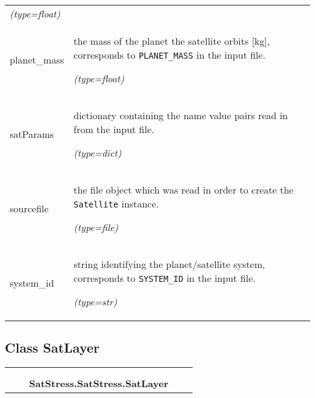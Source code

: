 \begin{longtable}{|p{\varnamewidth}|p{\vardescrwidth}|l}
            {\it (type=float)}&\\
\cline{1-2}
\raggedright p\-l\-a\-n\-e\-t\-\_\-m\-a\-s\-s\- & \raggedright the mass of the planet the satellite orbits [kg], corresponds to 
          \texttt{PLANET\_MASS} in the input file.

            {\it (type=float)}&\\
\cline{1-2}
\raggedright s\-a\-t\-P\-a\-r\-a\-m\-s\- & \raggedright dictionary containing the name value pairs read in from the input
          file.

            {\it (type=dict)}&\\
\cline{1-2}
\raggedright s\-o\-u\-r\-c\-e\-f\-i\-l\-e\- & \raggedright the file object which was read in order to create the 
          \texttt{Satellite} instance.

            {\it (type=file)}&\\
\cline{1-2}
\raggedright s\-y\-s\-t\-e\-m\-\_\-i\-d\- & \raggedright string identifying the planet/satellite system, corresponds to 
          \texttt{SYSTEM\_ID} in the input file.

            {\it (type=str)}&\\
\cline{1-2}
\end{longtable}



\subsection{Class SatLayer}

    \label{SatStress:SatStress:SatLayer}
\begin{tabular}{cccccc}
\multicolumn{2}{r}{\settowidth{\BCL}{object}\multirow{2}{\BCL}{object}}
&&
  \\\cline{3-3}
  &&\multicolumn{1}{c|}{}
&&
  \\
&&\multicolumn{2}{l}{\textbf{SatStress.SatStress.SatLayer}}
\end{tabular}

